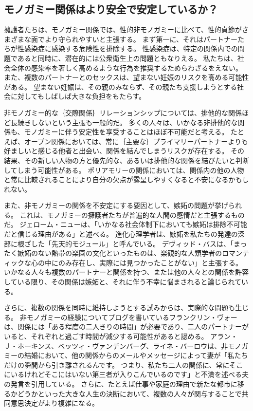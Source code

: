 \documentclass[paper=a4,book,openany]{jlreq}
\begin{document}
\subsection{モノガミー関係はより安全で安定しているか？}

擁護者たちは、モノガミー関係では、性的非モノガミーに比べて、性的貞節がさまざまな面でより守られやすいと主張する。
まず第一に、それはパートナーたちが性感染症に感染する危険性を排除する。
性感染症は、特定の関係内での問題であると同時に、潜在的には公衆衛生上の問題ともなりえる。
私たちは、社会全体の感染率を著しく高めるような行為を推奨するためらわざるをえない。
また、複数のパートナーとのセックスは、望まない妊娠のリスクを高める可能性がある。
望まない妊娠は、その親のみならず、その親たち支援しようとする社会に対してもしばしば大きな負担をもたらす。

非モノガミー的な｛交際関係｝{リレーションシップ}については、排他的な関係ほど長続きしないという主張も一般的だ。
多くの人々は、いかなる非排他的な関係も、モノガミーに伴う安定性を享受することはほぼ不可能だと考える。
たとえば、オープン関係においては、常に｛主要な｝{プライマリー}パートナーよりも好ましいと感じる他者と出会い、関係を結んでしまうリスクが存在する。
その結果、その新しい人物の方と優先的な、あるいは排他的な関係を結びたいと判断してしまう可能性がある。
ポリアモリーの関係においては、関係内の他の人物と常に比較されることにより自分の欠点が露呈しやすくなると不安になるかもしれない。

また、非モノガミーの関係を不安定にする要因として、嫉妬の問題が挙げられる。
これは、モノガミーの擁護者たちが普遍的な人間の感情だと主張するものだ。
ジェローム・ニューは、「いかなる社会体制下においても嫉妬は排除不可能だと信じる理由がある」と述べる\citep[p.43]{new00:_jealous_thoug}。
進化心理学者は、嫉妬を私たちの発達の深部に根ざした「先天的モジュール」と呼んでいる。
デヴィッド・バスは、「まったく嫉妬のない熱帯の楽園の文化といったものは、楽観的な人類学者のロマンティックな心の中にのみ存在し、実際には見つかったことがない」と主張する\citep[p.961]{buss01:_human_natur_cultur}。
いかなる人々も複数のパートナーと関係を持つ、または他の人々との関係を許容している限り、その関係は嫉妬と、それに伴う不幸に悩まされると論じられている。

さらに、複数の関係を同時に維持しようとする試みからは、実際的な問題も生じる。
非モノガミーの経験についてブログを書いているフランクリン・ヴォーは、関係には「ある程度の二人きりの時間」が必要であり、二人のパートナーがいると、それぞれと過ごす時間が減少する可能性があると認める\citep{veaux09:_some_musin_time_manag}。
アラン・Ｊ・ホーキンス、ベッツィ・ヴァンデンバーグ、ライネ・バーロウは、非モノガミーの結婚において、他の関係からのメールやメッセージによって妻が「私たちだけの瞬間から引き離されるんです。
つまり、私たち二人の関係に、常にそこにいるけれどそこにはいない第三者が入りこんでいるのです」と不満を述べる夫の発言を引用している\citep{hawkins17:_new_math_consen_nonmon}。
さらに、たとえば仕事や家庭の理由で新たな都市に移るかどうかといった大きな人生の決断において、複数の人々が関与することで共同意思決定がより複雑になる。
\end{document}

